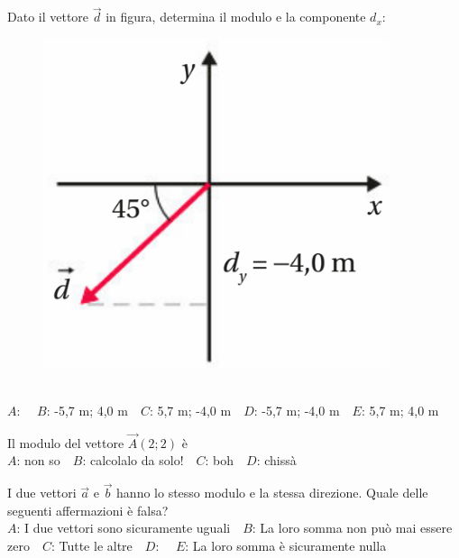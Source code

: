 \def\mcquestionnumber{4}


\mcquestionheader Dato il vettore $\vec{d}$ in figura, determina il modulo e la componente $d_x$: \begin{figure}[h!]   \begin{center}     \includegraphics[scale=0.35]{vettored.png}   \end{center} \end{figure}\\
{$A$}: \ \ {$B$}: -5,7 m; 4,0 m\ \ {$C$}: 5,7 m; -4,0 m\ \ {$D$}: -5,7 m; -4,0 m\ \ {$E$}: 5,7 m; 4,0 m\ \ 

\mcquestionfooter



\def\mcquestionnumber{5}


\mcquestionheader Il modulo del vettore $\vec{A}(2;2)$ è\\
{$A$}: non so\ \ {$B$}: calcolalo da solo!\ \ {$C$}: boh\ \ {$D$}: chissà\ \ 

\mcquestionfooter



\def\mcquestionnumber{6}


\mcquestionheader I due vettori $\vec{a}$ e $\vec{b}$ hanno lo stesso modulo e la stessa direzione. Quale delle seguenti affermazioni è falsa?\\
{$A$}: I due vettori sono sicuramente uguali\ \ {$B$}: La loro somma non può mai essere zero\ \ {$C$}: Tutte le altre\ \ {$D$}: \ \ {$E$}: La loro somma è sicuramente nulla\ \ 

\mcquestionfooter



\def\mcquestionnumber{7}


